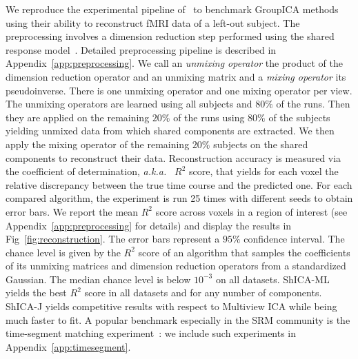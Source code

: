 \documentclass{report}
\newcommand{\aka}{{\em a.k.a.~}}
\begin{document}
We reproduce the experimental pipeline of~\cite{richard2020modeling} to benchmark GroupICA methods using their ability to reconstruct fMRI data of a left-out subject.
%
The preprocessing involves a dimension reduction step performed using the shared response model~\cite{chen2015reduced}. Detailed preprocessing pipeline is described in Appendix~\ref{app:preprocessing}. We call an \emph{unmixing operator} the product of the dimension
reduction operator and an unmixing matrix and a \emph{mixing operator} its pseudoinverse. There is one unmixing operator and one mixing operator per view.
The unmixing operators are learned using all subjects
and $80\%$ of the runs. Then they are applied on the remaining $20\%$ of the runs using $80\%$
of the subjects yielding unmixed data from which shared components are extracted. We
then apply the mixing operator of the remaining $20\%$ subjects on the shared components to reconstruct their data.
%
Reconstruction accuracy is measured via the coefficient of determination, \aka
$R^2$ score, that
yields for each voxel the relative discrepancy between the true time course and the predicted one.
%
For each compared algorithm, the experiment is run 25 times with different seeds to obtain error bars. We report the mean $R^2$ score across voxels in a region of interest (see Appendix~\ref{app:preprocessing} for details)
 and display the results in Fig~\ref{fig:reconstruction}. The error bars represent a $95\%$ confidence interval.
The chance level is given by the $R^2$ score of an algorithm that samples the coefficients of its unmixing matrices and dimension reduction operators from a standardized Gaussian. The median chance level is below $10^{-3}$ on all datasets. 
ShICA-ML yields the best $R^2$ score in all datasets and for any number of components. ShICA-J yields competitive results with respect to Multiview ICA while being much faster to fit. A popular benchmark especially in the SRM community is the time-segment matching experiment~\cite{chen2015reduced}: we include such experiments in Appendix~\ref{app:timesegment}.


% 
\end{document}
